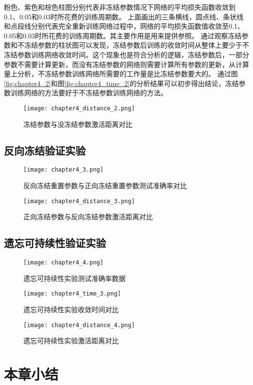 粉色、紫色和棕色柱图分别代表非冻结参数情况下网络的平均损失函数收敛到0.1、0.05和0.03时所花费的训练周期数。
上面画出的三条横线，圆点线、条状线和点段线分别代表完全重新训练网络过程中，网络的平均损失函数值收敛至0.1、0.05和0.03时所花费的训练周期数。其主要作用是用来提供参照。
通过观察冻结参数和不冻结参数的柱状图可以发现，冻结参数后训练的收敛时间从整体上要少于不冻结参数训练网络收敛时间。这个现象也是符合分析的逻辑，冻结参数后，一部分参数不需要计算更新，而没有冻结参数的网络则需要计算所有参数的更新，从计算量上分析，不冻结参数训练网络所需要的工作量是比冻结参数要大的。
通过图\ref{fig:chapter4_2}和图\ref{fig:chapter4_time_2}的分析结果可以初步得出结论，冻结参数训练网络的方法要好于不冻结参数训练网络的方法。
\begin{figure}
    \centering
    \texttt{[image: chapter4\_distance\_2.png]}
    \caption{冻结参数与没冻结参数激活距离对比}
    \label{fig:chapter4_distance_2}
\end{figure}
\subsection{反向冻结验证实验}
\begin{figure}
    \centering
    \texttt{[image: chapter4\_3.png]}
    \caption{反向冻结重置参数与正向冻结重置参数测试准确率对比}
    \label{fig:chapter4_3}
\end{figure}
\begin{figure}
    \centering
    \texttt{[image: chapter4\_distance\_3.png]}
    \caption{正向冻结参数与反向冻结参数激活距离对比}
    \label{fig:chapter4_distance_3}
\end{figure}
\subsection{遗忘可持续性验证实验}
\begin{figure}
    \centering
    \texttt{[image: chapter4\_4.png]}
    \caption{遗忘可持续性实验测试准确率数据}
    \label{fig:chapter4_4}
\end{figure}
\begin{figure}
    \centering
    \texttt{[image: chapter4\_time\_3.png]}
    \caption{遗忘可持续性实验收敛时间对比}
    \label{fig:chapter4_time_3}
\end{figure}
\begin{figure}
    \centering
    \texttt{[image: chapter4\_distance\_4.png]}
    \caption{遗忘可持续性实验激活距离对比}
    \label{fig:chapter4_distance_4}
\end{figure}
\section{本章小结}

